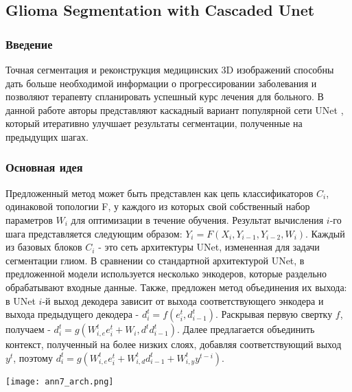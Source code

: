 \subsection*{Glioma Segmentation with Cascaded Unet}

\subsubsection*{Введение}
Точная сегментация и реконструкция медицинских 3D изображений способны дать 
больше необходимой информации о прогрессировании заболевания и позволяют терапевту 
спланировать успешный курс лечения для больного. В данной работе \cite{Cascaded} авторы представляют
каскадный вариант популярной сети UNet \cite{Unet}, который итеративно улучшает результаты сегментации, 
полученные на предыдущих шагах. \par
\subsubsection*{Основная идея}
Предложенный метод может быть представлен как цепь классификаторов 
\(C_i\), одинаковой топологии F, у каждого из которых свой собственный 
набор параметров \(W_i\) для оптимизации в течение обучения.
Результат вычисления \(i\)-го шага представляется следующим образом: 
\(Y_i=F(X_i,Y_{i-1}, Y_{i-2}, W_i)\). Каждый из базовых блоков \(C_i\) - это
сеть архитектуры UNet, измененная для задачи сегментации глиом. В сравнении 
со стандартной архитектурой UNet, в предложенной модели используется несколько 
энкодеров, которые раздельно обрабатывают входные данные. Также, предложен метод объединения 
их выхода: в UNet \(i\)-й выход декодера зависит от выхода соответствующего 
энкодера и выхода предыдущего декодера - \(d_i^{t}=f(e_i^{t}, d^{t}_{i-1})\). 
Раскрывая первую свертку \(f\), получаем - \(d_i^{t}=g(W_{i,e}^{t}e_i^{t}+W_{i},d^{t}d^{t}_{i-1})\).
Далее предлагается объединить контекст, полученный на более низких слоях, 
добавляя соответствующий выход \(y^t\), поэтому \(d_i^{t}=g(W_{i,e}^{t}e_i^{t}+W_{i,d}^{t}d^{t}_{i-1}+W_{i,y}^{t}y^{t-i})\).
\\
\begin{minipage}{1.0\linewidth}
    \begin{center}
        \texttt{[image: ann7\_arch.png]} \\
    \end{center}
\end{minipage}

